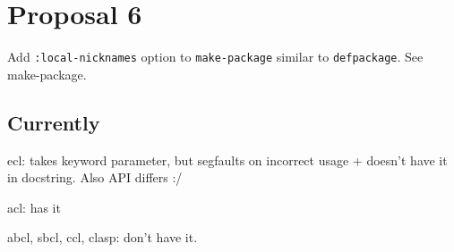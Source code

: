 \documentclass[11pt]{article}
\author{Grolter Bell}
\date{\today}
\title{}
\begin{document}
\section{Proposal 6}
\label{sec:orgc1d7ec7}
Add \texttt{:local-nicknames} option to \texttt{make-package} similar to \texttt{defpackage}. See
make-package.
\subsection{Currently}
\label{sec:org2a53470}
ecl: takes keyword parameter, but segfaults on incorrect usage + doesn't
have it in docstring. Also API differs :/

acl: has it

abcl, sbcl, ccl, clasp: don't have it.
\end{document}
